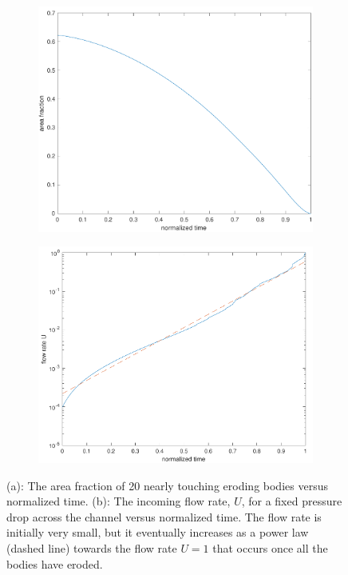 \documentclass[preprint, 10pt]{elsarticle}
\begin{document}
\begin{figure}[H]
\begin{subfigure}[b]{0.5\textwidth}
\includegraphics*[width =\linewidth]{./figs/porosity20dense}
\caption{}
\end{subfigure}
\begin{subfigure}[b]{0.51\textwidth}
\includegraphics*[width =\linewidth]{./figs/flow_rate20dense}
\caption{}
\end{subfigure}
\caption{\label{fig:Eroding20flowrate}(a): The area fraction of 20
nearly touching eroding bodies versus normalized time. (b): The incoming
flow rate, $U$, for a fixed pressure drop across the channel versus
normalized time.  The flow rate is initially very small, but it
eventually increases as a power law (dashed line) towards the flow rate
$U=1$ that occurs once all the bodies have eroded.}
\end{figure}
\end{document}
